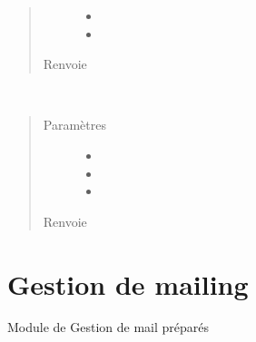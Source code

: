 \documentclass[letterpaper,10pt,french]{sphinxmanual}
\begin{document}
\begin{fulllineitems}
\begin{fulllineitems}
\begin{quote}
\begin{description}
\begin{itemize}
\item {} 
 \textendash{} 

\item {} 
 \textendash{} 

\end{itemize}

\item[{Renvoie}] \leavevmode


\end{description}\end{quote}

\end{fulllineitems}


\begin{fulllineitems}
\label{\detokenize{classes/cfgloader:toolbox.validata.Validata.validation}}~\begin{quote}\begin{description}
\item[{Paramètres}] \leavevmode\begin{itemize}
\item {} 
 \textendash{} 

\item {} 
 \textendash{} 

\item {} 
 \textendash{} 

\end{itemize}

\item[{Renvoie}] \leavevmode


\end{description}\end{quote}

\end{fulllineitems}


\end{fulllineitems}



\chapter{Gestion de mailing}
\label{\detokenize{classes/cfgloader:module-toolbox.mailbot}}\label{\detokenize{classes/cfgloader:gestion-de-mailing}}
Module de Gestion de mail préparés
\end{document}
